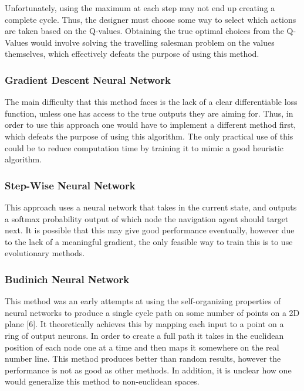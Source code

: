\documentclass{article}
\begin{document}
	Unfortunately, using the maximum at each step may not end up creating a complete cycle. Thus, the designer must choose some way to select which actions are taken based on the Q-values. Obtaining the true optimal choices from the Q-Values would involve solving the travelling salesman problem on the values themselves, which effectively defeats the purpose of using this method.
	
	\subsubsection{Gradient Descent Neural Network}
	The main difficulty that this method faces is the lack of a clear differentiable loss function, unless one has access to the true outputs they are aiming for. Thus, in order to use this approach one would have to implement a different method first, which defeats the purpose of using this algorithm. The only practical use of this could be to reduce computation time by training it to mimic a good heuristic algorithm.
	
	\subsubsection{Step-Wise Neural Network}
	This approach uses a neural network that takes in the current state, and outputs a softmax probability output of which node the navigation agent should target next. It is possible that this may give good performance eventually, however due to the lack of a meaningful gradient, the only feasible way to train this is to use evolutionary methods.
	
	\subsubsection{Budinich Neural Network}
	This method was an early attempts at using the self-organizing properties of neural networks to produce a single cycle path on some number of points on a 2D plane [6]. It theoretically achieves this by mapping each input to a point on a ring of output neurons. In order to create a full path it takes in the euclidean position of each node one at a time and then maps it somewhere on the real number line. This method produces better than random results, however the performance is not as good as other methods. In addition, it is unclear how one would generalize this method to non-euclidean spaces.
	
\end{document}
